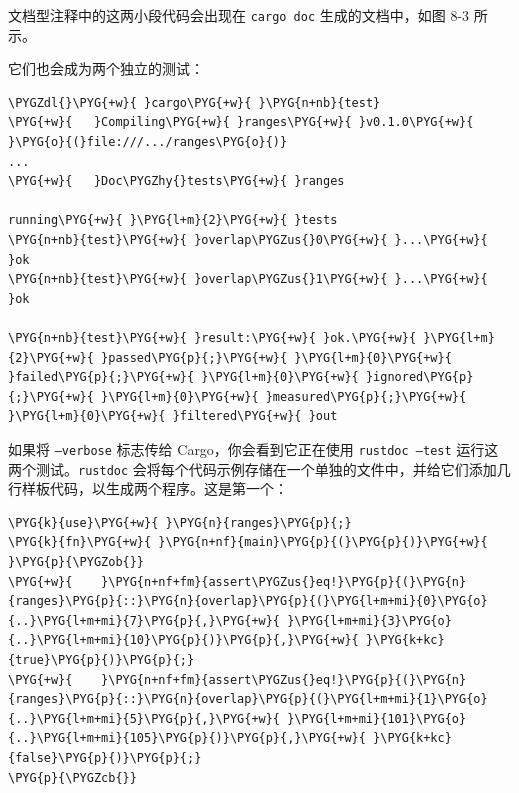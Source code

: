 文档型注释中的这两小段代码会出现在 \texttt{cargo doc} 生成的文档中，如图 8-3 所示。


它们也会成为两个独立的测试：

\begin{Verbatim}[commandchars=\\\{\},breaklines=true,breakanywhere=true,fontsize=\codefont,xleftmargin=17bp]
\PYGZdl{}\PYG{+w}{ }cargo\PYG{+w}{ }\PYG{n+nb}{test}
\PYG{+w}{   }Compiling\PYG{+w}{ }ranges\PYG{+w}{ }v0.1.0\PYG{+w}{ }\PYG{o}{(}file:///.../ranges\PYG{o}{)}
...
\PYG{+w}{   }Doc\PYGZhy{}tests\PYG{+w}{ }ranges

running\PYG{+w}{ }\PYG{l+m}{2}\PYG{+w}{ }tests
\PYG{n+nb}{test}\PYG{+w}{ }overlap\PYGZus{}0\PYG{+w}{ }...\PYG{+w}{ }ok
\PYG{n+nb}{test}\PYG{+w}{ }overlap\PYGZus{}1\PYG{+w}{ }...\PYG{+w}{ }ok

\PYG{n+nb}{test}\PYG{+w}{ }result:\PYG{+w}{ }ok.\PYG{+w}{ }\PYG{l+m}{2}\PYG{+w}{ }passed\PYG{p}{;}\PYG{+w}{ }\PYG{l+m}{0}\PYG{+w}{ }failed\PYG{p}{;}\PYG{+w}{ }\PYG{l+m}{0}\PYG{+w}{ }ignored\PYG{p}{;}\PYG{+w}{ }\PYG{l+m}{0}\PYG{+w}{ }measured\PYG{p}{;}\PYG{+w}{ }\PYG{l+m}{0}\PYG{+w}{ }filtered\PYG{+w}{ }out
\end{Verbatim}

如果将 \texttt{--verbose} 标志传给 Cargo，你会看到它正在使用 \texttt{rustdoc --test} 运行这两个测试。\texttt{rustdoc} 会将每个代码示例存储在一个单独的文件中，并给它们添加几行样板代码，以生成两个程序。这是第一个：

\begin{Verbatim}[commandchars=\\\{\},breaklines=true,breakanywhere=true,fontsize=\codefont,xleftmargin=17bp]
\PYG{k}{use}\PYG{+w}{ }\PYG{n}{ranges}\PYG{p}{;}
\PYG{k}{fn}\PYG{+w}{ }\PYG{n+nf}{main}\PYG{p}{(}\PYG{p}{)}\PYG{+w}{ }\PYG{p}{\PYGZob{}}
\PYG{+w}{    }\PYG{n+nf+fm}{assert\PYGZus{}eq!}\PYG{p}{(}\PYG{n}{ranges}\PYG{p}{::}\PYG{n}{overlap}\PYG{p}{(}\PYG{l+m+mi}{0}\PYG{o}{..}\PYG{l+m+mi}{7}\PYG{p}{,}\PYG{+w}{ }\PYG{l+m+mi}{3}\PYG{o}{..}\PYG{l+m+mi}{10}\PYG{p}{)}\PYG{p}{,}\PYG{+w}{ }\PYG{k+kc}{true}\PYG{p}{)}\PYG{p}{;}
\PYG{+w}{    }\PYG{n+nf+fm}{assert\PYGZus{}eq!}\PYG{p}{(}\PYG{n}{ranges}\PYG{p}{::}\PYG{n}{overlap}\PYG{p}{(}\PYG{l+m+mi}{1}\PYG{o}{..}\PYG{l+m+mi}{5}\PYG{p}{,}\PYG{+w}{ }\PYG{l+m+mi}{101}\PYG{o}{..}\PYG{l+m+mi}{105}\PYG{p}{)}\PYG{p}{,}\PYG{+w}{ }\PYG{k+kc}{false}\PYG{p}{)}\PYG{p}{;}
\PYG{p}{\PYGZcb{}}
\end{Verbatim}

